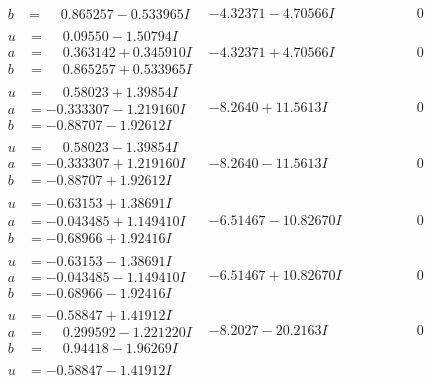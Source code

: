 \documentclass[1p]{elsarticle_modified}
\theoremstyle{definition}
\begin{document}
$$\begin{array}{c|c|c}
\begin{aligned}
b &= \phantom{-}0.865257 - 0.533965 I\end{aligned}
 & -4.32371 - 4.70566 I & \phantom{-0.000000 } 0 \\ \hline\begin{aligned}
u &= \phantom{-}0.09550 - 1.50794 I \\
a &= \phantom{-}0.363142 + 0.345910 I \\
b &= \phantom{-}0.865257 + 0.533965 I\end{aligned}
 & -4.32371 + 4.70566 I & \phantom{-0.000000 } 0 \\ \hline\begin{aligned}
u &= \phantom{-}0.58023 + 1.39854 I \\
a &= -0.333307 - 1.219160 I \\
b &= -0.88707 - 1.92612 I\end{aligned}
 & -8.2640 + 11.5613 I & \phantom{-0.000000 } 0 \\ \hline\begin{aligned}
u &= \phantom{-}0.58023 - 1.39854 I \\
a &= -0.333307 + 1.219160 I \\
b &= -0.88707 + 1.92612 I\end{aligned}
 & -8.2640 - 11.5613 I & \phantom{-0.000000 } 0 \\ \hline\begin{aligned}
u &= -0.63153 + 1.38691 I \\
a &= -0.043485 + 1.149410 I \\
b &= -0.68966 + 1.92416 I\end{aligned}
 & -6.51467 - 10.82670 I & \phantom{-0.000000 } 0 \\ \hline\begin{aligned}
u &= -0.63153 - 1.38691 I \\
a &= -0.043485 - 1.149410 I \\
b &= -0.68966 - 1.92416 I\end{aligned}
 & -6.51467 + 10.82670 I & \phantom{-0.000000 } 0 \\ \hline\begin{aligned}
u &= -0.58847 + 1.41912 I \\
a &= \phantom{-}0.299592 - 1.221220 I \\
b &= \phantom{-}0.94418 - 1.96269 I\end{aligned}
 & -8.2027 - 20.2163 I & \phantom{-0.000000 } 0 \\ \hline\begin{aligned}
u &= -0.58847 - 1.41912 I \\

\end{aligned}
\end{array}$$
\end{document}
